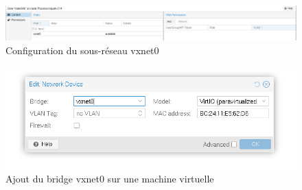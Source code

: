 \documentclass{article}
\begin{document}
\FloatBarrier

\begin{figure}[h]
    \centering
    \includegraphics[width=1\textwidth]{VNets.png}
    \caption{Configuration du sous-réseau vxnet0}
\end{figure}

\FloatBarrier

\begin{figure}[h]
    \centering
    \includegraphics[width=1\textwidth]{VMtoni.png}
    \caption{Ajout du bridge vxnet0 sur une machine virtuelle}
\end{figure}

\FloatBarrier
\end{document}
